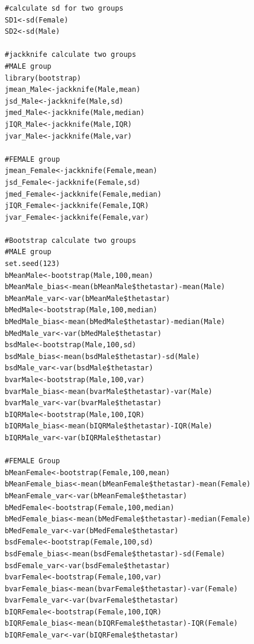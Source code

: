 \documentclass[10pt,letterpaper]{article}
\begin{document}
\begin{lstlisting}
#calculate sd for two groups
SD1<-sd(Female)
SD2<-sd(Male)

#jackknife calculate two groups
#MALE group
library(bootstrap)
jmean_Male<-jackknife(Male,mean)
jsd_Male<-jackknife(Male,sd)
jmed_Male<-jackknife(Male,median)
jIQR_Male<-jackknife(Male,IQR)
jvar_Male<-jackknife(Male,var)

#FEMALE group
jmean_Female<-jackknife(Female,mean)
jsd_Female<-jackknife(Female,sd)
jmed_Female<-jackknife(Female,median)
jIQR_Female<-jackknife(Female,IQR)
jvar_Female<-jackknife(Female,var)

#Bootstrap calculate two groups
#MALE group
set.seed(123)
bMeanMale<-bootstrap(Male,100,mean)
bMeanMale_bias<-mean(bMeanMale$thetastar)-mean(Male)
bMeanMale_var<-var(bMeanMale$thetastar)
bMedMale<-bootstrap(Male,100,median)
bMedMale_bias<-mean(bMedMale$thetastar)-median(Male)
bMedMale_var<-var(bMedMale$thetastar)
bsdMale<-bootstrap(Male,100,sd)
bsdMale_bias<-mean(bsdMale$thetastar)-sd(Male)
bsdMale_var<-var(bsdMale$thetastar)
bvarMale<-bootstrap(Male,100,var)
bvarMale_bias<-mean(bvarMale$thetastar)-var(Male)
bvarMale_var<-var(bvarMale$thetastar)
bIQRMale<-bootstrap(Male,100,IQR)
bIQRMale_bias<-mean(bIQRMale$thetastar)-IQR(Male)
bIQRMale_var<-var(bIQRMale$thetastar)

#FEMALE Group
bMeanFemale<-bootstrap(Female,100,mean)
bMeanFemale_bias<-mean(bMeanFemale$thetastar)-mean(Female)
bMeanFemale_var<-var(bMeanFemale$thetastar)
bMedFemale<-bootstrap(Female,100,median)
bMedFemale_bias<-mean(bMedFemale$thetastar)-median(Female)
bMedFemale_var<-var(bMedFemale$thetastar)
bsdFemale<-bootstrap(Female,100,sd)
bsdFemale_bias<-mean(bsdFemale$thetastar)-sd(Female)
bsdFemale_var<-var(bsdFemale$thetastar)
bvarFemale<-bootstrap(Female,100,var)
bvarFemale_bias<-mean(bvarFemale$thetastar)-var(Female)
bvarFemale_var<-var(bvarFemale$thetastar)
bIQRFemale<-bootstrap(Female,100,IQR)
bIQRFemale_bias<-mean(bIQRFemale$thetastar)-IQR(Female)
bIQRFemale_var<-var(bIQRFemale$thetastar)

\end{lstlisting}
\end{document}
